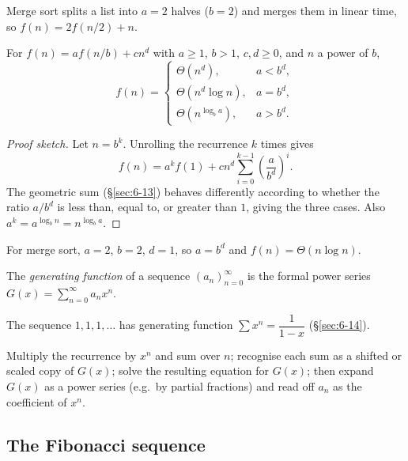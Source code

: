 \begin{example}
Merge sort splits a list into $a=2$ halves ($b=2$) and merges them in linear time, so $f(n) = 2f(n/2)+n$.
\end{example}

\begin{theorem}[Master theorem, special case $g(n)=cn^d$ (extra)]
For $f(n)=af(n/b)+cn^d$ with $a\ge1$, $b>1$, $c,d\ge0$, and $n$ a power of $b$,
\[
f(n) = \begin{cases}
\Theta(n^d), & a<b^d, \\
\Theta(n^d\log n), & a=b^d, \\
\Theta(n^{\log_b a}), & a>b^d.
\end{cases}
\]
\end{theorem}
\begin{proof}[Proof sketch]
Let $n=b^k$. Unrolling the recurrence $k$ times gives
\[
f(n) = a^kf(1) + cn^d\sum_{i=0}^{k-1}\left(\frac{a}{b^d}\right)^i.
\]
The geometric sum (\S\ref{sec:6-13}) behaves differently according to whether the ratio $a/b^d$ is less than, equal to, or greater than $1$, giving the three cases. Also $a^k=a^{\log_b n}=n^{\log_b a}$.
\end{proof}

\begin{example}
For merge sort, $a=2$, $b=2$, $d=1$, so $a=b^d$ and $f(n)=\Theta(n\log n)$.
\end{example}

\bigskip
\begin{definition}
The \emph{generating function} of a sequence $(a_n)_{n=0}^{\infty}$ is the formal power series $G(x) = \sum_{n=0}^{\infty} a_n x^n$.
\end{definition}

\begin{example}[Extra]
The sequence $1,1,1,\dots$ has generating function $\sum x^n = \dfrac{1}{1-x}$ (\S\ref{sec:6-14}).
\end{example}

\begin{note}
Multiply the recurrence by $x^n$ and sum over $n$; recognise each sum as a shifted or scaled copy of $G(x)$; solve the resulting equation for $G(x)$; then expand $G(x)$ as a power series (e.g.\ by partial fractions) and read off $a_n$ as the coefficient of $x^n$.
\end{note}

\subsection{The Fibonacci sequence}
\label{sec:6-7}

